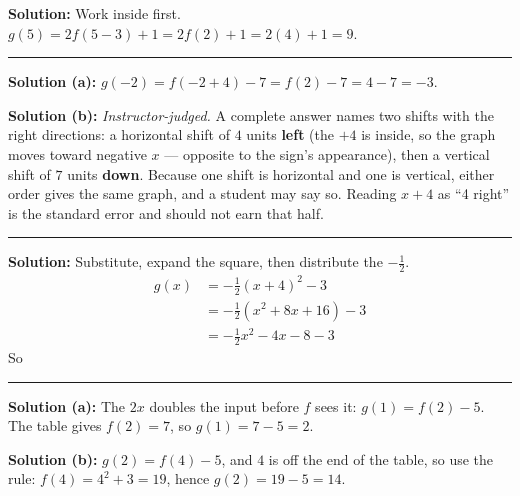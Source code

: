 \documentclass[12pt]{article}
\begin{document}



\textbf{Solution:} Work inside first. $g(5) = 2f(5 - 3) + 1 = 2f(2) + 1 = 2(4) + 1 = 9$. 

\vspace{0.1cm}\noindent\rule{\linewidth}{0.2pt}


\textbf{Solution (a):} $g(-2) = f(-2 + 4) - 7 = f(2) - 7 = 4 - 7 = -3$. 

\textbf{Solution (b):} \emph{Instructor-judged.} A complete answer names two shifts with the right directions: a horizontal shift of $4$ units \textbf{left} (the $+4$ is inside, so the graph moves toward negative $x$ --- opposite to the sign's appearance), then a vertical shift of $7$ units \textbf{down}. Because one shift is horizontal and one is vertical, either order gives the same graph, and a student may say so. Reading $x + 4$ as ``4 right'' is the standard error and should not earn that half.

\vspace{0.1cm}\noindent\rule{\linewidth}{0.2pt}


\textbf{Solution:} Substitute, expand the square, then distribute the $-\tfrac{1}{2}$.
\begin{align*}
  g(x) &= -\tfrac{1}{2}(x + 4)^{2} - 3 \\
       &= -\tfrac{1}{2}\left(x^{2} + 8x + 16\right) - 3 \\
       &= -\tfrac{1}{2}x^{2} - 4x - 8 - 3
\end{align*}
So 

\vspace{0.1cm}\noindent\rule{\linewidth}{0.2pt}


\textbf{Solution (a):} The $2x$ doubles the input before $f$ sees it: $g(1) = f(2) - 5$. The table gives $f(2) = 7$, so $g(1) = 7 - 5 = 2$. 

\textbf{Solution (b):} $g(2) = f(4) - 5$, and $4$ is off the end of the table, so use the rule: $f(4) = 4^{2} + 3 = 19$, hence $g(2) = 19 - 5 = 14$. 
\end{document}
